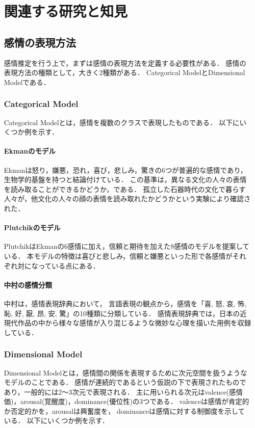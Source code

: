 \chapter{関連する研究と知見}

\section{感情の表現方法}
	感情推定を行う上で，まずは感情の表現方法を定義する必要性がある．
	感情の表現方法の種類として，大きく2種類がある\cite{emotion_analysis_survay}．
	Categorical ModelとDimensional Modelである．

	\subsection{Categorical Model}
		Categorical Modelとは，感情を複数のクラスで表現したものである．
		以下にいくつか例を示す．

		\subsubsection{Ekmanのモデル}
			Ekman\cite{ekman}は怒り，嫌悪，恐れ，喜び，悲しみ，驚きの6つが普遍的な感情であり，生物学的基盤を持つと結論付けている．
			この基準は，異なる文化の人々の表情を読み取ることができるかどうか，である．
			孤立した石器時代の文化で暮らす人々が，他文化の人々の顔の表情を読み取れたかどうかという実験により確認された．

		\subsubsection{Plutchikのモデル}
			Plutchik\cite{plutchik}はEkmanの6感情に加え，信頼と期待を加えた8感情のモデルを提案している．
			本モデルの特徴は喜びと悲しみ，信頼と嫌悪といった形で各感情がそれぞれ対になっている点にある．

		\subsubsection{中村の感情分類}
			中村\cite{kanjou_hyogen_jiten}は，感情表現辞典\cite{kanjou_hyogen_jiten}において，
			言語表現の観点から，感情を「喜, 怒, 哀, 怖, 恥, 好, 厭, 昂, 安, 驚」の10種類に分類している．
			感情表現辞典では，日本の近現代作品の中から様々な感情が入り混じるような微妙な心理を描いた用例を収録している．

	\subsection{Dimensional Model}
		Dimensional Modelとは，感情間の関係を表現するために次元空間を扱うようなモデルのことである．
		感情が連続的であるという仮説の下で表現されたものであり，一般的には2～3次元で表現される．
		主に用いられる次元はvalence(感情価)，arousal(覚醒度)，dominance(優位性)の3つである．
		valenceは感情が肯定的か否定的かを，arousalは興奮度を，
		dominanceは感情に対する制御度を示している\cite{emotion_model_1}\cite{emotion_model_2}．
		以下にいくつか例を示す．

